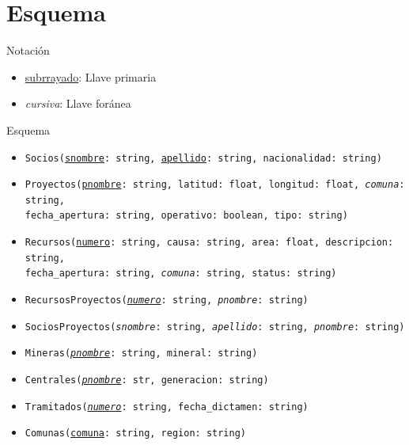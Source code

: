 \documentclass{article}
\begin{document}
\pagebreak

\section{Esquema}
Notación
	\begin{itemize}
		\item \underline{subrrayado}: Llave primaria
		\item \textit{cursiva}: Llave foránea
	\end{itemize}
Esquema

	\begin{itemize}
		\item \texttt{Socios(\underline{snombre}: string, \underline{apellido}: string, nacionalidad: string)} 
		\item \texttt{Proyectos(\underline{pnombre}: string, latitud: float, longitud: float, \textit{comuna}: string,\\ fecha\_apertura: string, operativo: boolean, tipo: string)} 
		\item \texttt{Recursos(\underline{numero}: string, causa: string, area: float, descripcion: string,\\ fecha\_apertura: string, \textit{comuna}: string, status: string)}
		\item \texttt{RecursosProyectos(\underline{\textit{numero}}: string, \textit{pnombre}: string)} 
		
		\item \texttt{SociosProyectos(\textit{snombre}: string, \textit{apellido}: string, \textit{pnombre}: string)} 
		 
		\item \texttt{Mineras(\underline{\textit{pnombre}}: string, mineral: string)} 
		\item \texttt{Centrales(\underline{\textit{pnombre}}: str, generacion: string)} 
		\item \texttt{Tramitados(\underline{\textit{numero}}: string, fecha\_dictamen: string)} 
		
		\item \texttt{Comunas(\underline{comuna}: string, region: string)} 
	\end{itemize}
\end{document}
